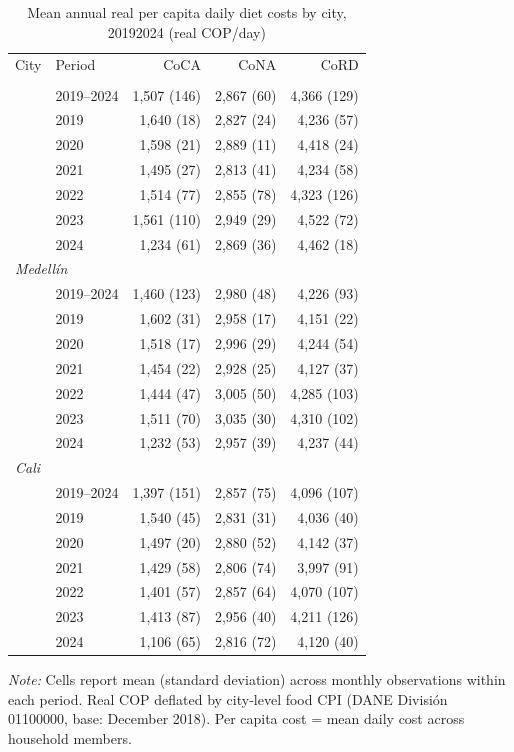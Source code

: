 \begin{table}[htbp]
\centering\small
\caption{Mean annual real per capita daily diet costs by city, 2019\textendash{}2024 (real COP/day)}
\label{tab:cost_levels}
\begin{tabular}{llrrr}
\toprule
City & Period & CoCA & CoNA & CoRD \\
\addlinespace[2pt]
\midrule
\multicolumn{5}{l}{\textit{Bogotá}} \\
 & 2019–2024 & 1,507 (146) & 2,867 (60) & 4,366 (129) \\
 & 2019 & 1,640 (18) & 2,827 (24) & 4,236 (57) \\
 & 2020 & 1,598 (21) & 2,889 (11) & 4,418 (24) \\
 & 2021 & 1,495 (27) & 2,813 (41) & 4,234 (58) \\
 & 2022 & 1,514 (77) & 2,855 (78) & 4,323 (126) \\
 & 2023 & 1,561 (110) & 2,949 (29) & 4,522 (72) \\
 & 2024 & 1,234 (61) & 2,869 (36) & 4,462 (18) \\
\midrule
\multicolumn{5}{l}{\textit{Medellín}} \\
 & 2019–2024 & 1,460 (123) & 2,980 (48) & 4,226 (93) \\
 & 2019 & 1,602 (31) & 2,958 (17) & 4,151 (22) \\
 & 2020 & 1,518 (17) & 2,996 (29) & 4,244 (54) \\
 & 2021 & 1,454 (22) & 2,928 (25) & 4,127 (37) \\
 & 2022 & 1,444 (47) & 3,005 (50) & 4,285 (103) \\
 & 2023 & 1,511 (70) & 3,035 (30) & 4,310 (102) \\
 & 2024 & 1,232 (53) & 2,957 (39) & 4,237 (44) \\
\midrule
\multicolumn{5}{l}{\textit{Cali}} \\
 & 2019–2024 & 1,397 (151) & 2,857 (75) & 4,096 (107) \\
 & 2019 & 1,540 (45) & 2,831 (31) & 4,036 (40) \\
 & 2020 & 1,497 (20) & 2,880 (52) & 4,142 (37) \\
 & 2021 & 1,429 (58) & 2,806 (74) & 3,997 (91) \\
 & 2022 & 1,401 (57) & 2,857 (64) & 4,070 (107) \\
 & 2023 & 1,413 (87) & 2,956 (40) & 4,211 (126) \\
 & 2024 & 1,106 (65) & 2,816 (72) & 4,120 (40) \\
\bottomrule
\end{tabular}
\begin{minipage}{\linewidth}
\vspace{2pt}\footnotesize
\textit{Note:} Cells report mean (standard deviation) across monthly observations within each period. Real COP deflated by city-level food CPI (DANE Divisi\'{o}n 01100000, base: December 2018). Per capita cost = mean daily cost across household members.
\end{minipage}
\end{table}
